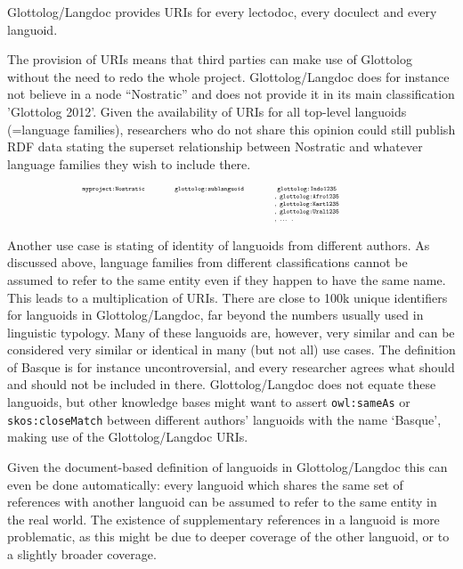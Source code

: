 \documentclass[10pt, a4paper]{article}
\begin{document}
Glottolog/Langdoc provides URIs for every lectodoc, every doculect and every languoid.


The provision of URIs means that third parties can make use
of Glottolog without the need to redo the whole project. Glottolog/Langdoc
does for instance not believe in a node ``Nostratic'' and does not provide it in its main classification 'Glottolog 2012'. Given the availability of URIs for all top-level languoids (=language families), researchers who do not share
this opinion could still publish RDF data stating the superset relationship between Nostratic and whatever language families they wish to include there.

\[ 
\tiny
\tt 
\begin{tabular}{p{2.2cm}p{2.4cm}p{3cm}}
\tt  myproject:Nostratic & \tt  glottolog:sublanguoid &~\tt   glottolog:Indo1235 \\
			&		 & , \tt   glottolog:Afro1235 \\
			&		 & , \tt   glottolog:Kart1235 \\
			&		 & , \tt   glottolog:Ural1235 \\ 
			&		 & , ... . \\ 
\end{tabular} 
 \]


Another use case is stating of identity
of languoids from different authors. As discussed above, language families from different classifications cannot be assumed to refer to the same entity even if they happen to have the same name. This leads to a multiplication of URIs. There are close to 100k unique identifiers for languoids in Glottolog/Langdoc, far beyond the numbers usually used in linguistic typology. Many of these languoids are, however, very similar and can be considered very similar or identical in many (but not all) use cases. The definition of Basque is for instance uncontroversial, and every researcher agrees what should and should not be included in there. Glottolog/Langdoc does not equate these languoids, but other knowledge bases  might want to assert \texttt{owl:sameAs} or \texttt{skos:closeMatch} between different authors' languoids with the name `Basque', making use of the Glottolog/Langdoc URIs.

Given the document-based definition of languoids in Glottolog/Langdoc this can even be done automatically: every languoid which shares the same set of references with another languoid can be assumed to refer to the same entity in the real world. The existence of supplementary references in a languoid is more problematic, as this might be due to deeper coverage of the other languoid, or to a slightly broader coverage.
\end{document}
